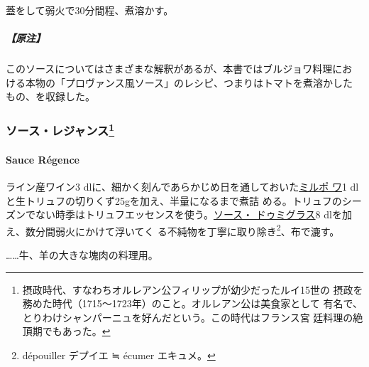 \begin{recette}
蓋をして弱火で30分間程、煮溶かす。

\hypertarget{ux539fux6ce8-7}{%
\subparagraph{【原注】}\label{ux539fux6ce8-7}}

このソースについてはさまざまな解釈があるが、本書ではブルジョワ料理にお
ける本物の「プロヴァンス風ソース」のレシピ、つまりはトマトを煮溶かした
もの、を収録した。

\maeaki

\hypertarget{ux30bdux30fcux30b9ux30ecux30b8ux30e3ux30f3ux30b975}{%
\subsubsection[ソース・レジャンス]{\texorpdfstring{ソース・レジャンス\footnote{摂政時代、すなわちオルレアン公フィリップが幼少だったルイ15世の
  摂政を務めた時代（1715〜1723年）のこと。オルレアン公は美食家として
  有名で、とりわけシャンパーニュを好んだという。この時代はフランス宮
  廷料理の絶頂期でもあった。}}{ソース・レジャンス}}\label{ux30bdux30fcux30b9ux30ecux30b8ux30e3ux30f3ux30b975}}

\hypertarget{sauce-regence}{%
\paragraph{Sauce Régence}\label{sauce-regence}}


ライン産ワイン3
dlに、細かく刻んであらかじめ日を通しておいた\protect\hyperlink{mirepoix}{ミルポ
ワ}1 dlと生トリュフの切りくず25gを加え、半量になるまで煮詰
める。トリュフのシーズンでない時季はトリュフエッセンスを使う。\protect\hyperlink{sauce-demi-glace}{ソース・
ドゥミグラス}8 dlを加え、数分間弱火にかけて浮いてく
る不純物を丁寧に取り除き\footnote{dépouiller デプイエ ≒ écumer
  エキュメ。}、布で漉す。

\ldots{}\ldots{}牛、羊の大きな塊肉の料理用。

\maeaki

\hypertarget{ux30bdux30fcux30b9ux30edux30d9ux30fcux30eb77}{%
}
\end{recette}

